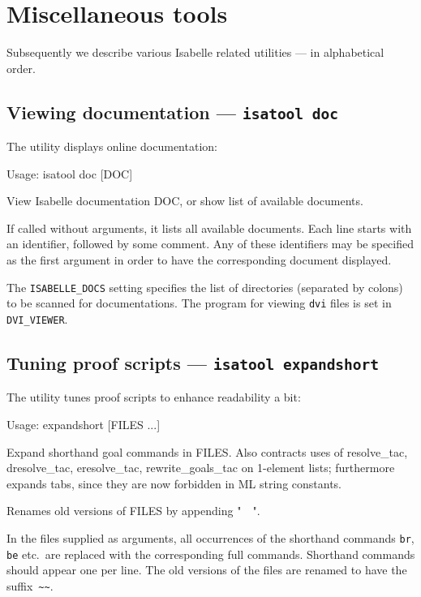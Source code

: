 

\chapter{Miscellaneous tools}

Subsequently we describe various Isabelle related utilities --- in
alphabetical order.


\section{Viewing documentation --- \texttt{isatool doc}} \label{sec:tool-doc}

The  utility displays online documentation:
\begin{ttbox}
Usage: isatool doc [DOC]

  View Isabelle documentation DOC, or show list of available documents.
\end{ttbox}
If called without arguments, it lists all available documents. Each
line starts with an identifier, followed by some comment. Any of these
identifiers may be specified as the first argument in order to have
the corresponding document displayed.

\medskip The \texttt{ISABELLE_DOCS} setting specifies the list of
directories (separated by colons) to be scanned for documentations.
The program for viewing \texttt{dvi} files is set in
\texttt{DVI_VIEWER}.


\section{Tuning proof scripts --- \texttt{isatool expandshort}}

The  utility tunes {\ML} proof scripts to enhance
readability a bit:
\begin{ttbox}
Usage: expandshort [FILES ...]

  Expand shorthand goal commands in FILES.  Also contracts uses of
  resolve_tac, dresolve_tac, eresolve_tac, rewrite_goals_tac on
  1-element lists; furthermore expands tabs, since they are now
  forbidden in ML string constants.

  Renames old versions of FILES by appending "~~".
\end{ttbox}
In the files supplied as arguments, all occurrences of the shorthand
commands \texttt{br}, \texttt{be} etc.\ are replaced with the
corresponding full commands.  Shorthand commands should appear one per
line.  The old versions of the files are renamed to have the
suffix~\verb'~~'.


